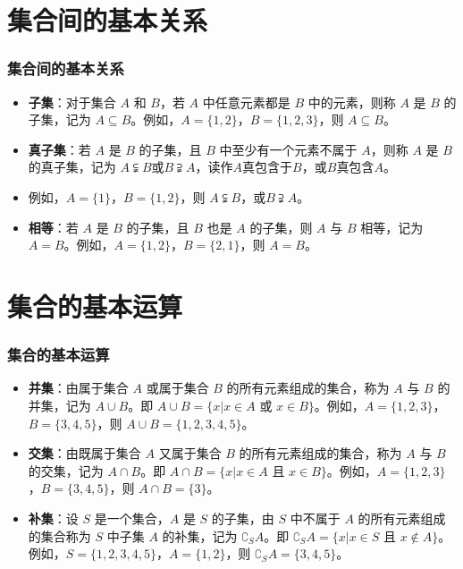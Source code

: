 \documentclass[aspectratio=169]{ctexbeamer} %
\begin{document}
\section{集合间的基本关系}
\begin{frame}
\frametitle{集合间的基本关系}
\begin{itemize}
\item \alert{\textbf{子集}}：对于集合 \(A\) 和 \(B\)，若 \(A\) 中任意元素都是 \(B\) 中的元素，则称 \(A\) 是 \(B\) 的子集，记为 \(A \subseteq B\)。例如，\(A = \{1, 2\}\)，\(B = \{1, 2, 3\}\)，则 \(A \subseteq B\)。\\
\item \alert{\textbf{真子集}}：若 \(A\) 是 \(B\) 的子集，且 \(B\) 中至少有一个元素不属于 \(A\)，则称 \(A\) 是 \(B\) 的真子集，记为 \(A \subsetneqq B\)或\(B \supsetneqq  A \)，读作\(A\)真包含于\(B\)，或\(B\)真包含\(A\)。
\item 例如，\(A = \{1\}\)，\(B = \{1, 2\}\)，则 \(A \subsetneqq B\)，或\(B \supsetneqq  A \)。\\
\item \alert{\textbf{相等}}：若 \(A\) 是 \(B\) 的子集，且 \(B\) 也是 \(A\) 的子集，则 \(A\) 与 \(B\) 相等，记为 \(A = B\)。例如，\(A = \{1, 2\}\)，\(B = \{2, 1\}\)，则 \(A = B\)。
\end{itemize}
\end{frame}

\section{集合的基本运算}

\begin{frame}
\frametitle{集合的基本运算}
\begin{itemize}
\item \textbf{\alert{并集}}：由属于集合 \(A\) 或属于集合 \(B\) 的所有元素组成的集合，称为 \(A\) 与 \(B\) 的并集，记为 \(A \cup B\)。即 \(A \cup B = \{x | x \in A \text{ 或 } x \in B\}\)。例如，\(A = \{1, 2, 3\}\)，\(B = \{3, 4, 5\}\)，则 \(A \cup B = \{1, 2, 3, 4, 5\}\)。\\

\item \textbf{\alert{交集}}：由既属于集合 \(A\) 又属于集合 \(B\) 的所有元素组成的集合，称为 \(A\) 与 \(B\) 的交集，记为 \(A \cap B\)。即 \(A \cap B = \{x | x \in A \text{ 且 } x \in B\}\)。例如，\(A = \{1, 2, 3\}\)，\(B = \{3, 4, 5\}\)，则 \(A \cap B = \{3\}\)。\\

\item \textbf{\alert{补集}}：设 \(S\) 是一个集合，\(A\) 是 \(S\) 的子集，由 \(S\) 中不属于 \(A\) 的所有元素组成的集合称为 \(S\) 中子集 \(A\) 的补集，记为 \(\complement_S A\)。即 \(\complement_S A = \{x | x \in S \text{ 且 } x \notin A\}\)。例如，\(S = \{1, 2, 3, 4, 5\}\)，\(A = \{1, 2\}\)，则 \(\complement_S A = \{3, 4, 5\}\)。
\end{itemize}
\end{frame}
\end{document}
